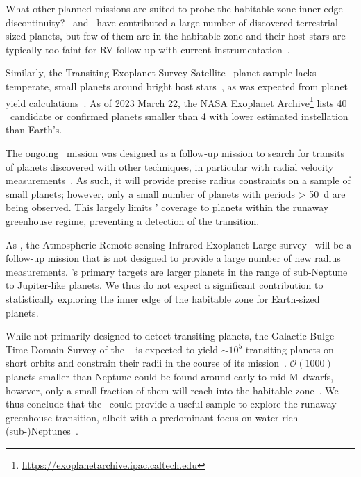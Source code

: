\documentclass[twocolumn,twocolappendix]{aastex631}
\begin{document}
What other planned missions are suited to probe the habitable zone inner edge discontinuity?
\kepler\ and \ktwo\ have contributed a large number of discovered terrestrial-sized planets, but few of them are in the habitable zone and their host stars are typically too faint for RV follow-up with current instrumentation~\citep{Dressing2015}.

Similarly, the Transiting Exoplanet Survey Satellite~\citep[\tess,][]{Ricker2014a} planet sample lacks temperate, small planets around bright host stars~\citep{Ment2023}, as was expected from planet yield calculations~\citep{Barclay2018}.
As of 2023 March 22, the NASA Exoplanet Archive\footnote{\url{https://exoplanetarchive.ipac.caltech.edu}} lists 40 \tess\ candidate or confirmed planets smaller than \SI{4}{\rEarth} with lower estimated instellation than Earth's.

The ongoing \cheops\ mission was designed as a follow-up mission to search for transits of planets discovered with other techniques, in particular with radial velocity measurements~\citep{Benz2021}.
As such, it will provide precise radius constraints on a sample of small planets; however, only a small number of planets with periods \SI{> 50}{\day} are being observed.
This largely limits \cheops' coverage to planets within the runaway greenhouse regime, preventing a detection of the transition.

As \cheops, the Atmospheric Remote sensing Infrared Exoplanet Large survey~\citep[\ariel,][]{Puig2016} will be a follow-up mission that is not designed to provide a large number of new radius measurements.
\ariel's primary targets are larger planets in the range of sub-Neptune to Jupiter-like planets.
We thus do not expect a significant contribution to statistically exploring the inner edge of the habitable zone for Earth-sized planets.

While not primarily designed to detect transiting planets, the Galactic Bulge Time Domain Survey of the \rst~\citep{Spergel2015} is expected to yield $\sim 10^5$ transiting planets on short orbits and constrain their radii in the course of its mission~\citep{Montet2017}.
$\mathcal{O} (1000)$ planets smaller than Neptune could be found around early to mid-M~dwarfs, however, only a small fraction of them will reach into the habitable zone~\citep{Tamburo2023}.
We thus conclude that the \rst\ could provide a useful sample to explore the runaway greenhouse transition, albeit with a predominant focus on water-rich (sub-)Neptunes~\citep[e.g.,][]{Pierrehumbert2022}.
\end{document}
